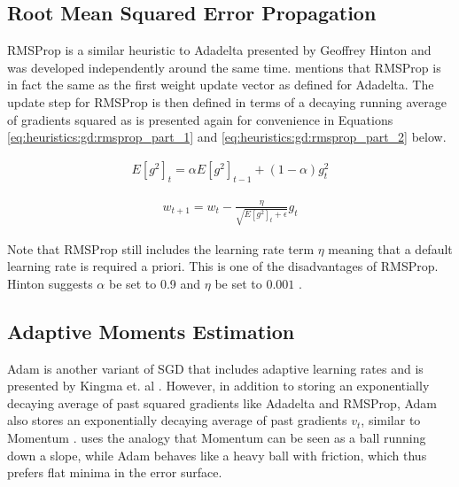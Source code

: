 \subsection{Root Mean Squared Error Propagation}
\label{sec:heuristics:rmsprop}

\Ac{RMSProp} is a similar heuristic to \ac{Adadelta} presented by Geoffrey Hinton \cite{ref:hinton:2012} and was developed independently around the same time. \citeauthor{ref:ruder:2016}\cite{ref:ruder:2016} mentions that \ac{RMSProp} is in fact the same as the first weight update vector as defined for \ac{Adadelta}. The update step for \ac{RMSProp} is then defined in terms of a decaying running average of gradients squared as is presented again for convenience in Equations \ref{eq:heuristics:gd:rmsprop_part_1} and \ref{eq:heuristics:gd:rmsprop_part_2} below.


\begin{equation}
    \label{eq:heuristics:gd:rmsprop_part_1}
    \begin{split}
        E[g^{2}]_{t} = \alpha E[g^{2}]_{t - 1} + (1 - \alpha)g_{t}^{2}
    \end{split}
\end{equation}

\begin{equation}
    \label{eq:heuristics:gd:rmsprop_part_2}
    \begin{split}
        w_{t+1} = w_{t} - \frac{\eta}{\sqrt{E[g^{2}]_{t} + \epsilon}} g_{t}
    \end{split}
\end{equation}

Note that \ac{RMSProp} still includes the learning rate term $\eta$ meaning that a default learning rate is required a priori. This is one of the disadvantages of \ac{RMSProp}. Hinton suggests $\alpha$ be set to 0.9 and $\eta$ be set to $0.001$ \cite{ref:hinton:2012}.


\subsection{Adaptive Moments Estimation}
\label{sec:heuristics:adam}

\Ac{Adam} is another variant of \ac{SGD} that includes adaptive learning rates and is presented by Kingma et. al \cite{ref:kingma:2014}. However, in addition to storing an exponentially decaying average of past squared gradients like \ac{Adadelta} and \ac{RMSProp}, \ac{Adam} also stores an exponentially decaying average of past gradients $v_{t}$, similar to \ac{Momentum} \cite{ref:ruder:2016}. \citeauthor{ref:heusel:2017} \cite{ref:heusel:2017} uses the analogy that \ac{Momentum} can be seen as a ball running down a slope, while \ac{Adam} behaves like a heavy ball with friction, which thus prefers flat minima in the error surface.

